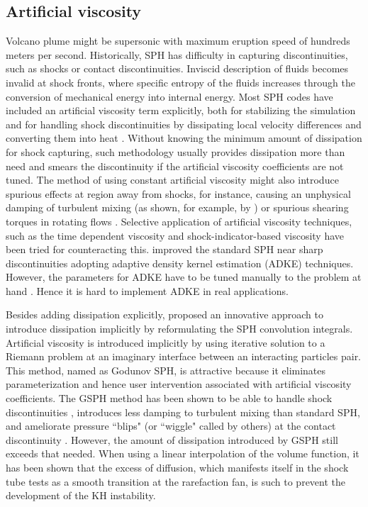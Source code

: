 \subsection{Artificial viscosity}
Volcano plume might be supersonic with maximum eruption speed of hundreds meters per second.
Historically, SPH has difficulty in capturing discontinuities, such as shocks or contact discontinuities. Inviscid description of fluids becomes invalid at shock fronts, where specific entropy of the fluids increases through the conversion of mechanical energy into internal energy. Most SPH codes have included an artificial viscosity term explicitly, both for stabilizing the simulation and for handling shock discontinuities by dissipating local velocity differences and converting them into heat \citep{monaghan1983shock, monaghan1997sph, klapp2012strong}. Without knowing the minimum amount of dissipation for shock capturing, such methodology usually provides dissipation more than need and smears the discontinuity if the artificial viscosity coefficients are not tuned. The method of using constant artificial viscosity might also introduce spurious effects at region away from shocks, for instance, causing an unphysical damping of turbulent mixing (as shown, for example, by \citet{borgani2012hydrodynamic}) or spurious
shearing torques in rotating flows \citep{flebbe1994smoothed}. Selective application of artificial viscosity techniques, such as the time dependent viscosity \citep{morris1997switch, dolag2005turbulent} and shock-indicator-based viscosity \citep{cullen2010inviscid} have been tried for counteracting this. 
\citet{sigalotti2008adaptive} improved the standard SPH near sharp discontinuities adopting adaptive density kernel estimation (ADKE) techniques. However, the parameters for ADKE have to be tuned manually to the problem at hand \citep{puri2014comparison}. Hence it is hard to implement ADKE in real applications.

Besides adding dissipation explicitly, \citet{inutsuka2002reformulation} proposed an innovative approach to introduce dissipation implicitly by reformulating the SPH convolution integrals. Artificial viscosity is introduced implicitly by using iterative solution to a Riemann problem at an imaginary interface between an interacting particles pair. This method, named as Godunov SPH, is attractive because it eliminates parameterization and hence user intervention associated with artificial viscosity coefficients. The GSPH method has been shown to be able to handle shock discontinuities \citep{inutsuka2002reformulation, cha2003implementations,iwasaki2011smoothed, puri2014approximate}, introduces less damping to turbulent mixing \citep{cha2010kelvin, borgani2012hydrodynamic} than standard SPH, and ameliorate pressure ``blips" (or ``wiggle" called by others) at the contact discontinuity \citep{borgani2012hydrodynamic}. However, the amount of dissipation introduced by GSPH still exceeds that needed. When using a linear interpolation of the volume function, it has been shown \citep{borgani2012hydrodynamic} that the excess of diffusion, which manifests itself in the shock tube tests as a smooth transition at the rarefaction fan, is such to prevent the development of the KH instability.

